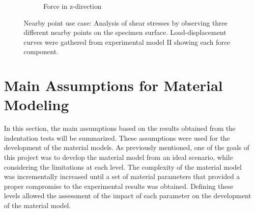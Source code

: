 \begin{figure}[htbp]
    \begin{subfigure}[b]{0.31\textwidth}
    \centering
    \caption{Force in z-direction}
    \end{subfigure}  
    \caption[Nearby point use case: Shear stresses analysis]{Nearby point use case: Analysis of shear stresses by observing three different nearby points on the specimen surface. Load-displacement curves were gathered from experimental model II showing each force component.}
    \label{fig:nbpexpIIgraph}
    \end{figure}

\section{Main Assumptions for Material Modeling}
\label{section:mainassumption}

In this section, the main assumptions based on the results obtained from 
the indentation tests will be summarized. These assumptions were used for the 
development of the material models. As previously mentioned, one of the goals of this project 
was to develop the material model from an ideal scenario, while considering the limitations 
at each level. The complexity of the material model was incrementally increased until a set 
of material parameters that provided a proper compromise to the experimental results was obtained.
Defining these levels allowed the assessment of the impact of each parameter on the development of the 
material model.\\

